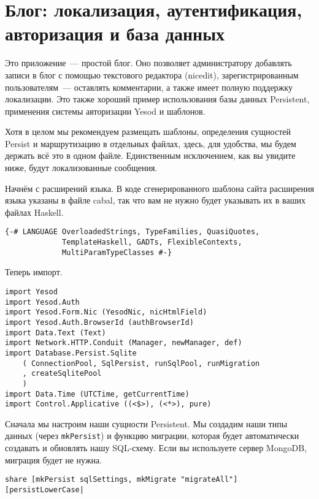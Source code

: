 ﻿\chapter{Блог: локализация, аутентификация, авторизация и база данных}
\label{chap:blog}

Это приложение~--- простой блог. Оно позволяет администратору добавлять записи в блог с помощью текстового редактора (nicedit), зарегистрированным пользователям~--- оставлять комментарии, а также имеет полную поддержку локализации. Это также хороший пример использования базы данных Persistent, применения системы авторизации Yesod и шаблонов.

Хотя в целом мы рекомендуем размещать шаблоны, определения сущностей Persist и маршрутизацию в отдельных файлах, здесь, для удобства, мы будем держать всё это в одном файле. Единственным исключением, как вы увидите ниже, будут локализованные сообщения.

Начнём с расширений языка. В коде сгенерированного шаблона сайта расширения языка указаны в файле cabal, так что вам не нужно будет указывать их в ваших файлах Haskell.
 
\begin{lstlisting}
{-# LANGUAGE OverloadedStrings, TypeFamilies, QuasiQuotes,
             TemplateHaskell, GADTs, FlexibleContexts,
             MultiParamTypeClasses #-}
\end{lstlisting}
 
Теперь импорт. 

\begin{lstlisting} 
import Yesod
import Yesod.Auth
import Yesod.Form.Nic (YesodNic, nicHtmlField)
import Yesod.Auth.BrowserId (authBrowserId)
import Data.Text (Text)
import Network.HTTP.Conduit (Manager, newManager, def)
import Database.Persist.Sqlite
    ( ConnectionPool, SqlPersist, runSqlPool, runMigration
    , createSqlitePool
    )
import Data.Time (UTCTime, getCurrentTime)
import Control.Applicative ((<$>), (<*>), pure)
\end{lstlisting}%

Сначала мы настроим наши сущности Persistent. Мы создадим наши типы данных (через \lstinline!mkPersist!) и функцию миграции, которая будет автоматически создавать и обновлять нашу SQL-схему. Если вы используете сервер MongoDB, миграция будет не нужна.

\begin{lstlisting}
share [mkPersist sqlSettings, mkMigrate "migrateAll"] [persistLowerCase|
\end{lstlisting}
 

